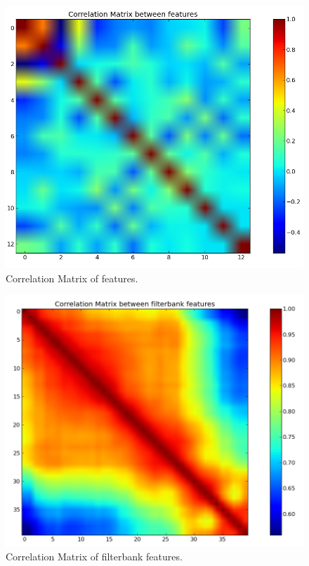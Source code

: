 \documentclass[12pt,a4paper,oneside]{article}
\begin{document}
\begin{figure}
\centering
\includegraphics[scale=0.4]{../correlation.png}
\caption{Correlation Matrix of features.}
\label{fig:corr}
\end{figure}

\begin{figure}
\centering
\includegraphics[scale=0.4]{../correlation1.png}
\caption{Correlation Matrix of filterbank features.}
\label{fig:corr1}
\end{figure}
\end{document}
